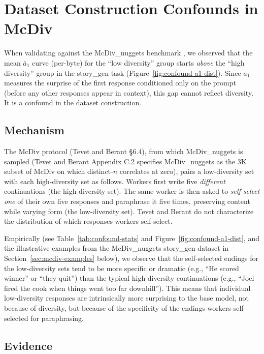 \section{Dataset Construction Confounds in McDiv}\label{app:confound}

When validating against the McDiv\_nuggets benchmark \citep{tevet2020evaluating}, we observed that the mean $\bar{a}_1$ curve (per-byte) for the ``low diversity'' group starts \emph{above} the ``high diversity'' group in the story\_gen task (Figure~\ref{fig:confound-a1-dist}).
Since $a_1$ measures the surprise of the first response conditioned only on the prompt (before any other responses appear in context), this gap cannot reflect diversity.
It is a confound in the dataset construction.

\subsection{Mechanism}

The McDiv protocol (Tevet and Berant \S6.4), from which McDiv\_nuggets is sampled (Tevet and Berant Appendix C.2 specifies McDiv\_nuggets as the 3K subset of McDiv on which distinct-$n$ correlates at zero), pairs a low-diversity set with each high-diversity set as follows.
Workers first write five \emph{different} continuations (the high-diversity set).
The same worker is then asked to \emph{self-select one} of their own five responses and paraphrase it five times, preserving content while varying form (the low-diversity set).
Tevet and Berant do not characterize the distribution of which responses workers self-select.

Empirically (see Table~\ref{tab:confound-stats} and Figure~\ref{fig:confound-a1-dist}, and the illustrative examples from the McDiv\_nuggets story\_gen dataset in Section~\ref{sec:mcdiv-examples} below), we observe that the self-selected endings for the low-diversity sets tend to be more specific or dramatic (e.g., ``He scored winner'' or ``they quit'') than the typical high-diversity continuations (e.g., ``Joel fired the cook when things went too far downhill'').
This means that individual low-diversity responses are intrinsically more surprising to the base model, not because of diversity, but because of the specificity of the endings workers self-selected for paraphrasing.

\subsection{Evidence}

